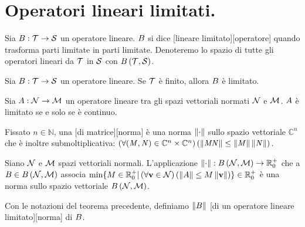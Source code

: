 \section{Operatori lineari limitati.}
\label{AnalisiFunzionale_OperatoriLineariLimitati}
\begin{Definition}
	Sia $B: \mathcal{T} \rightarrow \mathcal{S}$ un operatore lineare. $B$ si dice [lineare limitato][operatore] quando trasforma parti limitate in parti limitate. Denoteremo lo spazio di tutte gli operatori lineari da $\mathcal{T}$ in $\mathcal{S}$ con $B \left ( \mathcal{T} , \mathcal{S} \right )$.
\end{Definition}
\begin{Theorem}
	Sia $B: \mathcal{T} \rightarrow \mathcal{S}$ un operatore lineare. Se $\mathcal{T}$ \`e finito, allora $B$ \`e limitato.
\end{Theorem}
\begin{Theorem}
	Sia $A: \mathcal{N} \rightarrow \mathcal{M}$ un operatore lineare tra gli spazi vettoriali normati $\mathcal{N}$ e $\mathcal{M}$. $A$ \`e limitato se e solo se \`e continuo.
\end{Theorem}
\begin{Definition}
	Fissato $n \in \mathbb{N}$, una [di matrice][norma] \`e una norma $\Norm{\cdot}$ sullo spazio vettoriale $\mathbb{C}^n$ che \`e inoltre submoltiplicativa: $\ForAll{(\Matrix,\VarMatrix) \in \mathbb{C}^n \times \mathbb{C}^n}{\Norm{\Matrix\VarMatrix} \leq \Norm{\Matrix}\Norm{\VarMatrix}}$.
\end{Definition}
\begin{Theorem}
	Siano $\mathcal{N}$ e $\mathcal{M}$ spazi vettoriali normali. L'applicazione $\Norm{\cdot}: \BoundedLinearOperators{\NormedSpace}{\VarNormedSpace} \rightarrow \RealNonNegative$ che a $B \in B \left ( \mathcal{N} , \mathcal{M} \right )$ associa $\min \lbrace M \in \RealNonNegative | \ForAll{\Vector \in \NormedSpace}{\Norm{\LinearOperator} \leq M \Norm{\Vector}} \rbrace \in \RealNonNegative$ \`e una norma sullo spazio vettoriale $B \left ( \mathcal{N} , \mathcal{M} \right )$.
\end{Theorem}
\begin{Definition}
	Con le notazioni del teorema precedente, definiamo $\Norm{\BoundedLinearOperator}$ [di un operatore lineare limitato][norma] di $B$.
\end{Definition}
